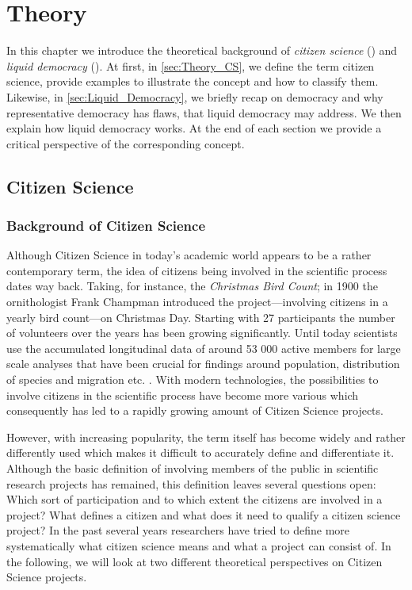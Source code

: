 \chapter{Theory}
\label{ch:Theory}

In this chapter we introduce the theoretical background of \textit{citizen science} () and \textit{liquid democracy} (). At first, in \autoref{sec:Theory_CS}, we define the term citizen science, provide examples to illustrate the concept and how to classify them. Likewise, in \autoref{sec:Liquid_Democracy}, we briefly recap on democracy and why representative democracy has flaws, that liquid democracy may address. We then explain how liquid democracy works. At the end of each section we provide a critical perspective of the corresponding concept.


\section{Citizen Science}
\label{sec:Theory_CS}
\subsection{Background of Citizen Science}
\label{ssec:Background_CS}
Although Citizen Science in today’s academic world appears to be a rather contemporary term, the idea of citizens being involved in the scientific process dates way back. Taking, for instance, the \textit{Christmas Bird Count}; in 1900 the ornithologist Frank Champman introduced the project---involving citizens in a yearly bird count---on Christmas Day. Starting with 27 participants the number of volunteers over the years has been growing significantly. Until today scientists use the accumulated longitudinal data of around 53 000 active members for large scale analyses that have been crucial for findings around population, distribution of species and migration etc. \parencite{Lebaron2017}. With modern technologies, the possibilities to involve citizens in the scientific process have become more various which consequently has led to a rapidly growing amount of Citizen Science projects. 

However, with increasing popularity, the term itself has become widely and rather differently used which makes it difficult to accurately define and differentiate it. Although the basic definition of involving members of the public in scientific research projects has remained, this definition leaves several questions open: Which sort of participation and to which extent the citizens are involved in a project? What defines a citizen and what does it need to qualify a citizen science project? In the past several years researchers have tried to define more systematically what citizen science means and what a  project can consist of. In the following, we will look at two  different theoretical perspectives on Citizen Science projects. 



